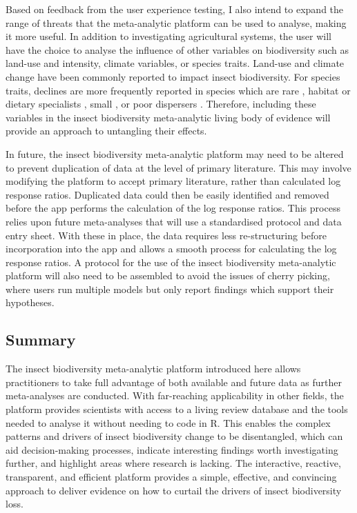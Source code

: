 \documentclass[11pt]{article}
\begin{document}
		\noindent Based on feedback from the user experience testing, I also intend to expand the range of threats that the meta-analytic platform can be used to analyse, making it more useful. In addition to investigating agricultural systems, the user will have the choice to analyse the influence of other variables on biodiversity such as land-use and intensity, climate variables, or species traits. Land-use \citep{newbold2016global,seibold2019arthropod,gillespie2022landscape} and climate change \citep{deutsch2008impacts,lister2018climate,engelhardt2022consistent} have been commonly reported to impact insect biodiversity. For species traits, declines are more frequently reported in species which are rare \citep{powney2019widespread,outhwaite2020complex}, habitat or dietary specialists \citep{biesmeijer2006parallel,boyes2019bucking,wagner2021window}, small \citep{homburg2019have}, or poor dispersers \citep{cardoso2020scientists}. Therefore, including these variables in the insect biodiversity meta-analytic living body of evidence will provide an approach to untangling their effects. 
		
		\noindent In future, the insect biodiversity meta-analytic platform may need to be altered to prevent duplication of data at the level of primary literature. This may involve modifying the platform to accept primary literature, rather than calculated log response ratios. Duplicated data could then be easily identified and removed before the app performs the calculation of the log response ratios. This process relies upon future meta-analyses that will use a standardised protocol and data entry sheet. With these in place, the data requires less re-structuring before incorporation into the app and allows a smooth process for calculating the log response ratios. A protocol for the use of the insect biodiversity meta-analytic platform will also need to be assembled to avoid the issues of cherry picking, where users run multiple models but only report findings which support their hypotheses. 
		
		\subsection{Summary}
		The insect biodiversity meta-analytic platform introduced here allows practitioners to take full advantage of both available and future data as further meta-analyses are conducted. With far-reaching applicability in other fields, the platform provides scientists with access to a living review database and the tools needed to analyse it without needing to code in R. This enables the complex patterns and drivers of insect biodiversity change to be disentangled, which can aid decision-making processes, indicate interesting findings worth investigating further, and highlight areas where research is lacking. The interactive, reactive, transparent, and efficient platform provides a simple, effective, and convincing approach to deliver evidence on how to curtail the drivers of insect biodiversity loss.  
		
\end{document}
